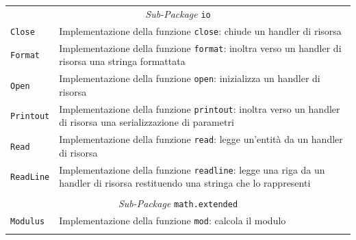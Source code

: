 \begin{longtable}{p{3.5cm}p{8.5cm}}
\multicolumn{2}{c}{\emph{Sub-Package} \texttt{io}}\\
	\hdashline[5pt/5pt]
		\texttt{Close} & Implementazione della funzione \texttt{close}: chiude un handler di risorsa\\ 
	\hdashline[1pt/5pt]
		\texttt{Format} & Implementazione della funzione \texttt{format}: inoltra verso un handler di risorsa una stringa formattata\\ 
	\hdashline[1pt/5pt]
		\texttt{Open} & Implementazione della funzione \texttt{open}: inizializza un handler di risorsa\\ 
	\hdashline[1pt/5pt]
		\texttt{Printout} & Implementazione della funzione \texttt{printout}: inoltra verso un handler di risorsa una serializzazione di parametri\\ 
	\hdashline[1pt/5pt]
		\texttt{Read} & Implementazione della funzione \texttt{read}: legge un'entità da un handler di risorsa \\ 
	\hdashline[1pt/5pt]
		\texttt{ReadLine} & Implementazione della funzione \texttt{readline}: legge una riga da un handler di risorsa restituendo una stringa che lo rappresenti\\ 
	\hline\\		
	
	
\multicolumn{2}{c}{\emph{Sub-Package} \texttt{math.extended}}\\
	\hdashline[5pt/5pt]
		\texttt{Modulus} & Implementazione della funzione \texttt{mod}: calcola il modulo\\ 
	\hline\\		
	

\end{longtable}
